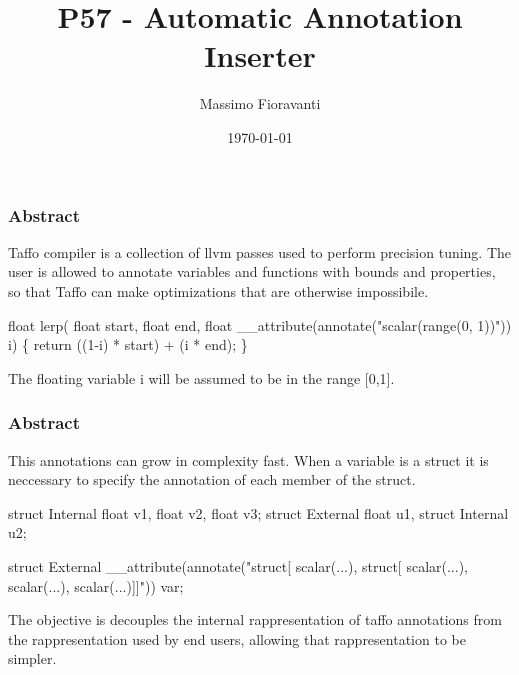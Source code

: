 \documentclass{beamer}
\title{P57 - Automatic Annotation Inserter}
\author{Massimo Fioravanti}
\institute{Polimi}
\date{\today}
\begin{document}
\begin{frame}
	\titlepage
\end{frame}

\begin{frame}[fragile]
	\frametitle{Abstract}
	\begin{block}{}
		Taffo compiler is a collection of llvm passes used to perform precision tuning.
		The user is allowed to annotate variables and functions with bounds and properties, so that Taffo can make optimizations that are otherwise impossibile.
	\end{block}

	\begin{alertblock}{}
	\begin{semiverbatim}
		float lerp(
		\quad float start, 
		\quad float end, 
		\quad float __attribute(annotate("scalar(range(0, 1))")) i)
		\{
		\quad return ((1-i) * start) + (i * end);
		\}
	\end{semiverbatim}
	\end{alertblock}

	\begin{block}{}
		The floating variable i will be assumed to be in the range [0,1].
	\end{block}
\end{frame}

\begin{frame}[fragile]
	\frametitle{Abstract}
	\begin{block}{}
		This annotations can grow in complexity fast. 
		When a variable is a struct it is neccessary to specify the annotation of each member of the struct.
	\end{block}
	
	\begin{alertblock}{}
	\begin{semiverbatim}	
		struct Internal {float v1, float v2, float v3};
		struct External {float u1, struct Internal u2};
		
		struct External __attribute(annotate("struct[
		\quad scalar(...), struct[
		\quad \quad scalar(...), 
		\quad \quad scalar(...), 
		\quad \quad scalar(...)]]")) var;
	\end{semiverbatim}
	\end{alertblock}
	\begin{block}{}
		The objective is decouples the internal rappresentation of taffo annotations from the rappresentation used by end users, allowing that rappresentation to be simpler.
	\end{block}
\end{frame}
\end{document}
